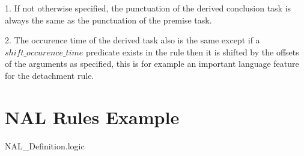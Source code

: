 \documentclass{article}
\begin{document}
1. If not otherwise specified, the punctuation of the derived conclusion task is always the same as the punctuation of the premise task.

2. The occurence time of the derived task also is the same except if a $shift\_occurence\_time$ predicate exists in the rule then it is shifted by the offsets of the arguments as specified, this is for example an important language feature for the detachment rule.


\section{NAL Rules Example}

\begin{tiny}

NAL_Definition.logic

\end{tiny}



\end{document}
